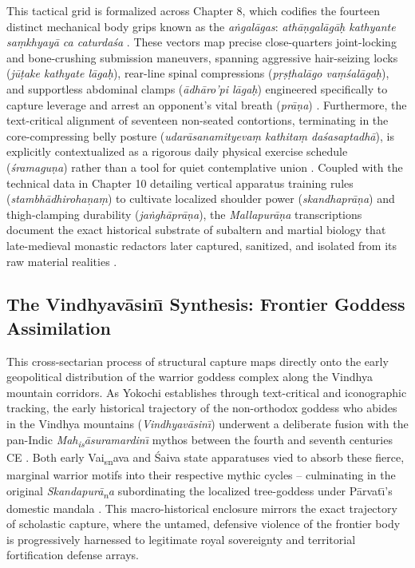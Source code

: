 \documentclass[11pt,twoside,letterpaper]{article}
\begin{document}
This tactical grid is formalized across Chapter 8, which codifies the fourteen distinct mechanical body grips known as the \textit{aṅgalāgas}: \textit{athāṇgalāgāḥ kathyante saṃkhyayā ca caturdaśa} \cite{MP_7}. These vectors map precise close-quarters joint-locking and bone-crushing submission maneuvers, spanning aggressive hair-seizing locks (\textit{jūṭake kathyate lāgaḥ}), rear-line spinal compressions (\textit{pṛṣṭhalāgo vaṃśalāgaḥ}), and supportless abdominal clamps (\textit{ādhāro'pi lāgaḥ}) engineered specifically to capture leverage and arrest an opponent's vital breath (\textit{prāṇa}) \cite{MP_7}. Furthermore, the text-critical alignment of seventeen non-seated contortions, terminating in the core-compressing belly posture (\textit{udarāsanamityevaṃ kathitaṃ daśasaptadhā}), is explicitly contextualized as a rigorous daily physical exercise schedule (\textit{śramaguṇa}) rather than a tool for quiet contemplative union \cite{MP_7}. Coupled with the technical data in Chapter 10 detailing vertical apparatus training rules (\textit{stambhādhirohaṇaṃ}) to cultivate localized shoulder power (\textit{skandhaprāṇa}) and thigh-clamping durability (\textit{jaṅghāprāṇa}), the \textit{Mallapurāṇa} transcriptions document the exact historical substrate of subaltern and martial biology that late-medieval monastic redactors later captured, sanitized, and isolated from its raw material realities \cite{Birch2024, MP_7, Mallinson2017}.

\subsection{The Vindhyav\={a}sin\={\i} Synthesis: Frontier Goddess Assimilation}
This cross-sectarian process of structural capture maps directly onto the early geopolitical distribution of the warrior goddess complex along the Vindhya mountain corridors. As Yokochi establishes through text-critical and iconographic tracking, the early historical trajectory of the non-orthodox goddess who abides in the Vindhya mountains (\textit{Vindhyav\={a}sin\={\i}}) underwent a deliberate fusion with the pan-Indic \textit{Mah\textsubscript{i}\textsubscript{s}\={a}suramardin\={\i}} mythos between the fourth and seventh centuries CE \cite{Yokochi1999}. Both early Vai\textsubscript{s}\textsubscript{n}ava and \'Saiva state apparatuses vied to absorb these fierce, marginal warrior motifs into their respective mythic cycles -- culminating in the original \textit{Skandapur\={a}\textsubscript{n}a} subordinating the localized tree-goddess under P\={a}rvat\={\i}’s domestic mandala \cite{Yokochi1999}. This macro-historical enclosure mirrors the exact trajectory of scholastic capture, where the untamed, defensive violence of the frontier body is progressively harnessed to legitimate royal sovereignty and territorial fortification defense arrays.
\end{document}
